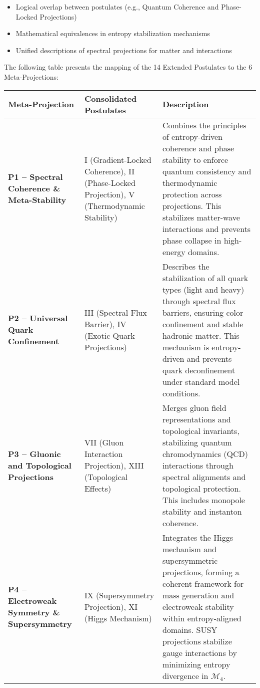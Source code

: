 \documentclass[10.5pt,a4paper]{article}
\begin{document}
\begin{itemize}
    \item Logical overlap between postulates (e.g., Quantum Coherence and Phase-Locked Projections)
    \item Mathematical equivalences in entropy stabilization mechanisms
    \item Unified descriptions of spectral projections for matter and interactions
\end{itemize}

The following table presents the mapping of the 14 Extended Postulates to the 6 Meta-Projections:
{\small
\begin{tabularx}{\textwidth}{>{\bfseries}p{4cm} p{5cm} X}
\toprule
Meta-Projection & Consolidated Postulates & Description \\
\midrule

P1 – Spectral Coherence \& Meta-Stability &
I (Gradient-Locked Coherence), II (Phase-Locked Projection), V (Thermodynamic Stability) &
Combines the principles of entropy-driven coherence and phase stability to enforce quantum consistency 
and thermodynamic protection across projections. This stabilizes matter-wave interactions and prevents phase collapse 
in high-energy domains. \\

P2 – Universal Quark Confinement &
III (Spectral Flux Barrier), IV (Exotic Quark Projections) &
Describes the stabilization of all quark types (light and heavy) through spectral flux barriers, 
ensuring color confinement and stable hadronic matter. This mechanism is entropy-driven and 
prevents quark deconfinement under standard model conditions. \\

P3 – Gluonic and Topological Projections &
VII (Gluon Interaction Projection), XIII (Topological Effects) &
Merges gluon field representations and topological invariants, stabilizing quantum chromodynamics (QCD) 
interactions through spectral alignments and topological protection. This includes monopole stability 
and instanton coherence. \\

P4 – Electroweak Symmetry \& Supersymmetry &
IX (Supersymmetry Projection), XI (Higgs Mechanism) &
Integrates the Higgs mechanism and supersymmetric projections, forming a coherent framework for mass 
generation and electroweak stability within entropy-aligned domains. SUSY projections stabilize gauge interactions 
by minimizing entropy divergence in \( \mathcal{M}_4 \). \\


\end{tabularx}}
\end{document}
